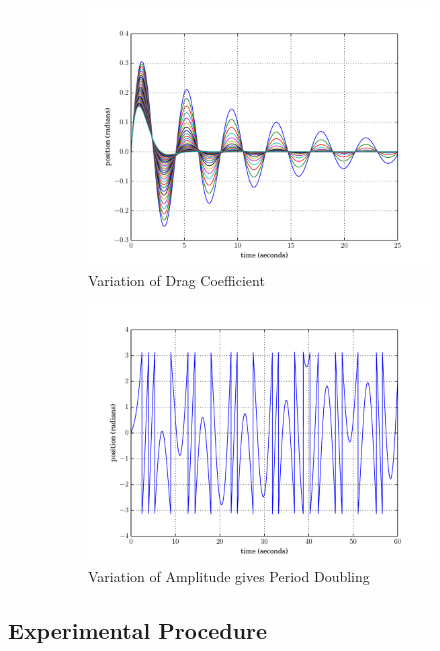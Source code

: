 \begin{figure}[!t]
	\captionsetup{width=0.8\textwidth}
	\begin{subfigure}[t]{.49\textwidth}
		\centering
		\includegraphics[width=\textwidth]{Figures/plot02.pdf}
		\caption{Variation of Drag Coefficient}
		\label{fig:01A}
	\end{subfigure}
	\begin{subfigure}[t]{0.49\textwidth}
		\centering
		\includegraphics[width=\textwidth]{Figures/plot03.pdf}
		\caption{Variation of Amplitude gives Period Doubling}
		\label{fig:02A}
	\end{subfigure}
	\caption{\blindtext}
	\label{fig:contour}
\end{figure}

\subsection{Experimental Procedure}
\blindtext[2]
